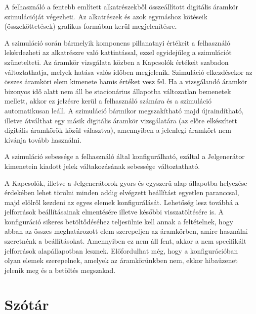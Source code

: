 A felhasználó a fentebb említett alkatrészekből összeállított digitális áramkör szimulációját végezheti. Az alkatrészek és azok egymáshoz kötéseik (összeköttetések) grafikus formában kerül megjelenítésre.

A szimuláció során bármelyik komponens pillanatnyi értékeit a felhasználó lekérdezheti az alkatrészre való kattintással, ezzel egyidejűleg a szimulációt szünetelteti. Az áramkör vizsgálata közben a Kapcsolók értékeit szabadon változtathatja, melyek hatása valós időben megjelenik. Szimuláció elkezdésekor az összes áramköri elem kimenete hamis értéket vesz fel. Ha a vizsgálandó áramkör bizonyos idő alatt nem áll be stacionárius állapotba változatlan bemenetek mellett, akkor ez jelzésre kerül a felhasználó számára és a szimuláció automatikusan leáll. A szimuláció bármikor megszakítható majd újraindítható, illetve átválthat egy másik digitális áramkör vizsgálatára (az előre elkészített digitális áramkörök közül választva), amennyiben a jelenlegi áramkört nem kívánja tovább használni.

A szimuláció sebessége a felhasználó által konfigurálható, ezáltal a Jelgenerátor kimenetein kiadott jelek váltakozásának sebessége változtatható.

A Kapcsolók, illetve a Jelgenerátorok gyors és egyszerű alap állapotba helyezése érdekében lehet törölni minden addig elvégzett beállítást egyetlen paranccsal, majd elölről kezdeni az egyes elemek konfigurálását. Lehetőség lesz továbbá a jelforrások beállításainak elmentésére illetve későbbi visszatöltésére is. A konfiguráció sikeres betöltődéséhez teljesülnie kell annak a feltételnek, hogy abban az összes meghatározott elem szerepeljen az áramkörben, amire használni szeretnénk a beállításokat. Amennyiben ez nem áll fent, akkor a nem specifikált jelforrások alapállapotban lesznek. Előfordulhat még, hogy a konfigurációban olyan elemek szerepelnek, amelyek az áramkörünkben nem, ekkor hibaüzenet jelenik meg és a betöltés megszakad.

\section{Szótár}
\label{sec:dictionary}

